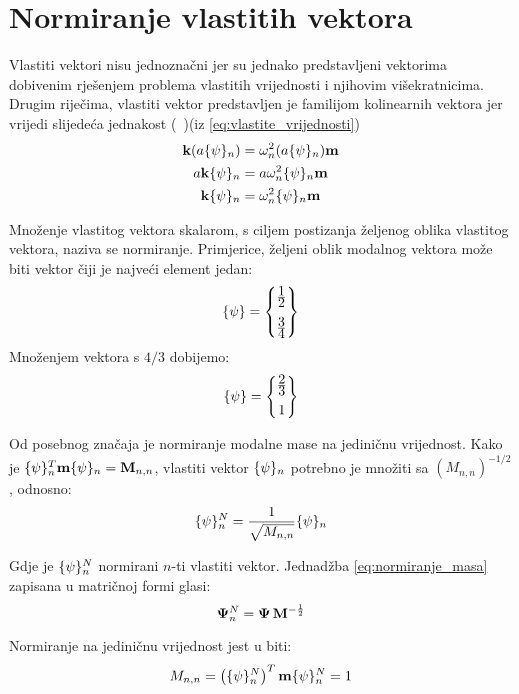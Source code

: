 \section{Normiranje vlastitih vektora}\label{sec:normiranje}
Vlastiti vektori nisu jednoznačni jer su jednako predstavljeni vektorima dobivenim
rješenjem problema vlastitih vrijednosti i njihovim višekratnicima. Drugim riječima,
vlastiti vektor predstavljen je familijom kolinearnih vektora jer vrijedi slijedeća
jednakost (~\cite{hefangfu2001})(iz \eqref{eq:vlastite_vrijednosti})
\[
    \begin{aligned}
        \kk(a\vtor{\psi}{}_n)&=\omega_n^2(a\vtor{\psi}{}_n)\mm\\
        a\kk\vtor{\psi}{}_n&=a\omega_n^2\vtor{\psi}{}_n\mm\\
        \kk\vtor{\psi}{}_n&=\omega_n^2\vtor{\psi}{}_n\mm
    \end{aligned}
\]

Množenje vlastitog vektora skalarom, s ciljem postizanja željenog oblika vlastitog
vektora, naziva se normiranje. Primjerice, željeni oblik modalnog vektora može biti 
vektor čiji je najveći element jedan:
\[
    \vtor{\psi}{}=
        \begin{Bmatrix}
            \ffrac{1}{2}\\[8pt]
            \ffrac{3}{4}
        \end{Bmatrix}
\]
Množenjem vektora s $4/3$ dobijemo:
\[
    \vtor{\psi}{}=
        \begin{Bmatrix}
            \ffrac{2}{3}\\[6pt]
            1
        \end{Bmatrix}
\]

Od posebnog značaja je normiranje modalne mase na jediničnu vrijednost. Kako je
$\vtor{\psi}{}_n^T\mm\vtor{\psi}{}_n=\mathbf{M}_{n,n}$, vlastiti vektor $\vtor{\psi}{}_n$
potrebno je množiti sa $(M_{n,n})^{-1/2}$, odnosno:
\begin{equation}\label{eq:normiranje_masa}
    \vtor{\psi}{}_n^N=\frac{1}{\sqrt{M_{n,n}}}\vtor{\psi}{}_n
\end{equation}

Gdje je $\vtor{\psi}{}_n^N$ normirani $n$-ti vlastiti vektor. Jednadžba
\eqref{eq:normiranje_masa} zapisana u matričnoj formi glasi:
\begin{equation}\label{eq:normiranje_masa_matricno}
    \mathbf{\Psi}_n^N=\mathbf{\Psi}\,\mathbf{M}^{-\frac{1}{2}}
\end{equation}

Normiranje na jediničnu vrijednost jest u biti:
\begin{equation}\label{eq:relacija_normirani}
        M_{n,n}=\left(\vtor{\psi}{}_n^N\right)^T\mm\vtor{\psi}{}_n^N=1
\end{equation}

